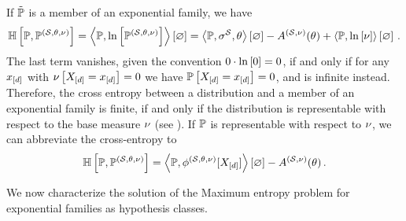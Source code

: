 \begin{example}
    \label{exa:cEntropyExp}
    If $\tilde{\mathbb{P}}$ is a member of an exponential family, we have %
    \begin{align*}
        \mathbb{H}\left[\mathbb{P},\mathbb{P}^{(\mathcal{S},\theta,\nu)}\right]
        = \left\langle \mathbb{P},\ln \left[ \mathbb{P}^{(\mathcal{S},\theta,\nu)} \right]\right\rangle \left[ \varnothing \right]
        = \left\langle \mathbb{P},\sigma^{\mathcal{S}},\theta\right\rangle \left[ \varnothing \right] - A^{(\mathcal{S},\nu)}(\theta) + \left\langle \mathbb{P},\ln \left[ \nu \right]\right\rangle \left[ \varnothing \right] \, .
    \end{align*}
    The last term vanishes, given the convention $0\cdot\ln \left[ 0 \right]=0$, if and only if for any $x_{[d]}$ with $\nu\left[X_{[d]}=x_{[d]}\right]=0$ we have $\mathbb{P}\left[X_{[d]}=x_{[d]}\right]=0$, and is infinite instead.
    Therefore, the cross entropy between a distribution and a member of an exponential family is finite, if and only if the distribution is representable with respect to the base measure $\nu$ (see ).
    If $\mathbb{P}$ is representable with respect to $\nu$, we can abbreviate the cross-entropy to
    \begin{align*}
        \mathbb{H}\left[\mathbb{P},\mathbb{P}^{(\mathcal{S},\theta,\nu)}\right]
        = \left\langle \mathbb{P},\phi^{(\mathcal{S},\theta,\nu)}[X_{[d]}]\right\rangle \left[ \varnothing \right] -A^{(\mathcal{S},\nu)}(\theta) \, .
    \end{align*}
\end{example}



We now characterize the solution of the Maximum entropy problem for exponential families as hypothesis classes.

